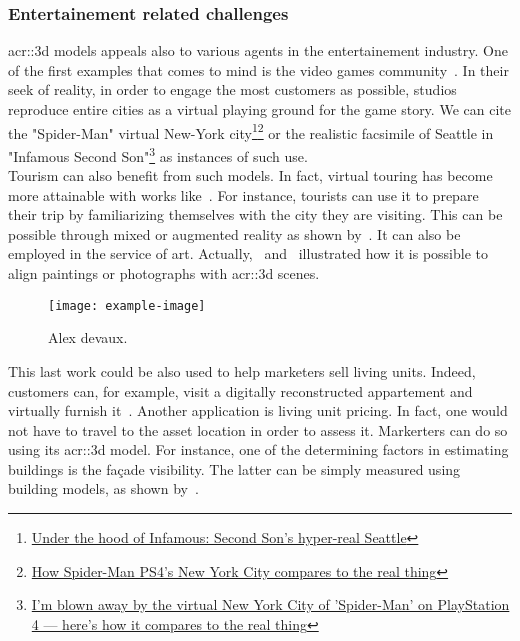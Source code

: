        \subsubsection{Entertainement related challenges}
            \gls{acr::3d} models appeals also to various agents in the entertainement industry.
            One of the first examples that comes to mind is the video games community~\parencite{watson2008procedural}.
            In their seek of reality, in order to engage the most customers as possible, studios reproduce entire cities as a virtual playing ground for the game story.
            We can cite the "Spider-Man" virtual New-York city\footnote{
                \href{https://www.polygon.com/2013/9/25/4702318/under-the-hood-of-infamous-second-son-hyper-real-seattle}{Under the hood of Infamous: Second Son's hyper-real Seattle}
            }\footnote{
                \href{https://www.polygon.com/e3/2018/6/12/17453588/spider-man-ps4-new-york-city-avengers-demo-preview}{How Spider-Man PS4’s New York City compares to the real thing}
            } or the realistic facsimile of Seattle in "Infamous Second Son"\footnote{
                \href{http://www.businessinsider.fr/us/spider-man-ps4-new-york-city-2018-9}{I'm blown away by the virtual New York City of 'Spider-Man' on PlayStation 4 — here's how it compares to the real thing}
            } as instances of such use.\\
            Tourism can also benefit from such models.
            In fact, virtual touring has become more attainable with works like~\textcite{koutsoudis20073d}.
            For instance, tourists can use it to prepare their trip by familiarizing themselves with the city they are visiting.
            This can be possible through mixed or augmented reality as shown by~\textcite{devaux20183d}.
            It can also be employed in the service of art.
            Actually,~\textcite{aubry2014painting} and~\textcite{russell2011automatic} illustrated how it is possible to align paintings or photographs with \gls{acr::3d} scenes.\\
            \begin{figure}[htpb]
                \centering
                \texttt{[image: example-image]}            
                \caption{
                    \label{fig::augemented_reality} Alex devaux.
                }
            \end{figure}
            This last work could be also used to help marketers sell living units.
            Indeed, customers can, for example, visit a digitally reconstructed appartement and virtually furnish it~\parencite{kim2019planar}.
            Another application is living unit pricing.
            In fact, one would not have to travel to the asset location in order to assess it.
            Markerters can do so using its \gls{acr::3d} model.
            For instance, one of the determining factors in estimating buildings is the fa\c{c}ade visibility.
            The latter can be simply measured using building models, as shown by~\textcite{albrecht2013assessing}.

